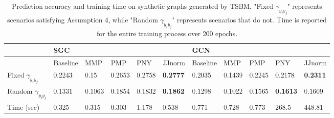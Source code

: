 

\begin{table}[!h]
    \fontsize{7}{8.4}\selectfont
    \centering
    \vspace{-15pt}
    \caption{Prediction accuracy and training time on synthetic graphs generated by TSBM. "Fixed $\gamma_{y_i y_j}$" represents scenarios satisfying Assumption 4, while "Random $\gamma_{y_i y_j}$" represents scenarios that do not. Time is reported for the entire training process over 200 epochs.}

    \begin{tabular}{l|lllll|lllll}
\hline
           & \multicolumn{5}{l|}{SGC}                  & \multicolumn{5}{l}{GCN}                   \\ \hline
           & Baseline & MMP   & PMP   & PNY   & JJnorm & Baseline & MMP   & PMP   & PNY   & JJnorm \\ \hline
Fixed $\gamma_{y_i y_j}$  & 0.2243 & 0.15   & 0.2653 & 0.2758 & \textbf{0.2777} & 0.2035 & 0.1439 & 0.2245 & 0.2178          & \textbf{0.2311} \\ \hline
Random $\gamma_{y_i y_j}$ & 0.1331 & 0.1063 & 0.1854 & 0.1832 & \textbf{0.1862} & 0.1298 & 0.1022 & 0.1565 & \textbf{0.1613} & 0.1609          \\ \hline
Time (sec) & 0.325    & 0.315 & 0.303 & 1.178 & 0.538  & 0.771    & 0.728 & 0.773 & 268.5 & 448.81 \\ \hline
\end{tabular}

    \label{table:synthetic}
    \vspace{-5pt}
\end{table}
